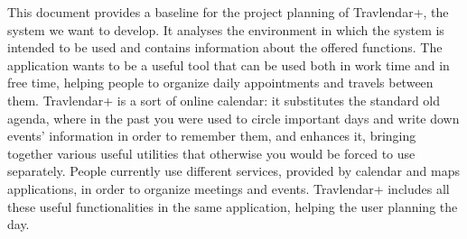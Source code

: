 This document provides a baseline for the project planning of Travlendar+, the system we want to develop. It analyses the environment in which the system is intended to be used and contains information about the offered functions.
\newline
\newline
The application wants to be a useful tool that can be used both in work time and in free time, helping people to organize daily appointments and travels between them.
\newline
\newline
Travlendar+ is a sort of online calendar: it substitutes the standard old agenda, where in the past you were used to circle important days and write down events' information in order to remember them, and enhances it, bringing together various useful utilities that otherwise you would be forced to use separately.
\newline
People currently use different services, provided by calendar and maps applications, in order to organize meetings and events. Travlendar+ includes all these useful functionalities in the same application, helping the user planning the day.